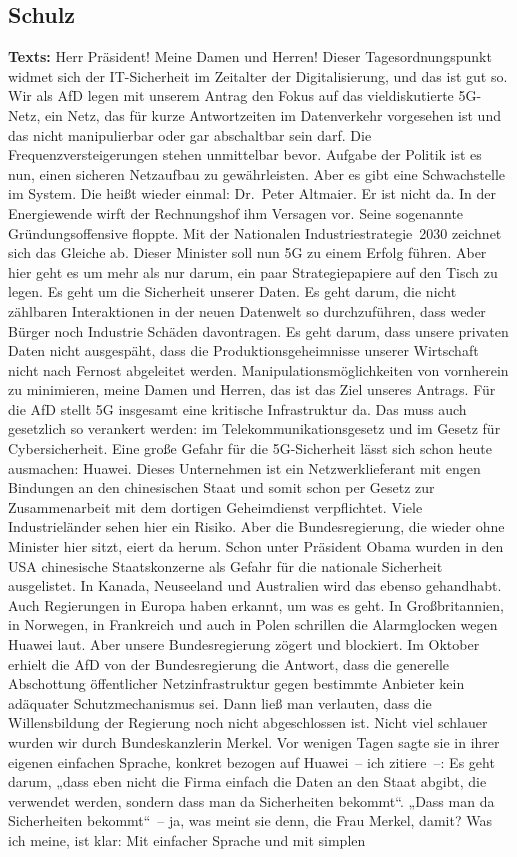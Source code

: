 \documentclass{article}
\begin{document}
\subsection{Schulz}
\noindent\textbf{Texts:} Herr Präsident! Meine Damen und Herren! Dieser Tagesordnungspunkt widmet sich der IT-Sicherheit im Zeitalter der Digitalisierung, und das ist gut so. Wir als AfD legen mit unserem Antrag den Fokus auf das vieldiskutierte 5G-Netz, ein Netz, das für kurze Antwortzeiten im Datenverkehr vorgesehen ist und das nicht manipulierbar oder gar abschaltbar sein darf. Die Frequenzversteigerungen stehen unmittelbar bevor. Aufgabe der Politik ist es nun, einen sicheren Netzaufbau zu gewährleisten. Aber es gibt eine Schwachstelle im System. Die heißt wieder einmal: Dr. Peter Altmaier. Er ist nicht da. In der Energiewende wirft der Rechnungshof ihm Versagen vor. Seine sogenannte Gründungsoffensive floppte. Mit der Nationalen Industriestrategie 2030 zeichnet sich das Gleiche ab.  Dieser Minister soll nun 5G zu einem Erfolg führen. Aber hier geht es um mehr als nur darum, ein paar Strategiepapiere auf den Tisch zu legen. Es geht um die Sicherheit unserer Daten. Es geht darum, die nicht zählbaren Interaktionen in der neuen Datenwelt so durchzuführen, dass weder Bürger noch Industrie Schäden davontragen. Es geht darum, dass unsere privaten Daten nicht ausgespäht, dass die Produktionsgeheimnisse unserer Wirtschaft nicht nach Fernost abgeleitet werden. Manipulationsmöglichkeiten von vornherein zu minimieren, meine Damen und Herren, das ist das Ziel unseres Antrags. Für die AfD stellt 5G insgesamt eine kritische Infrastruktur da. Das muss auch gesetzlich so verankert werden: im Telekommunikationsgesetz und im Gesetz für Cybersicherheit.  Eine große Gefahr für die 5G-Sicherheit lässt sich schon heute ausmachen: Huawei. Dieses Unternehmen ist ein Netzwerklieferant mit engen Bindungen an den chinesischen Staat und somit schon per Gesetz zur Zusammenarbeit mit dem dortigen Geheimdienst verpflichtet. Viele Industrieländer sehen hier ein Risiko. Aber die Bundesregierung, die wieder ohne Minister hier sitzt, eiert da herum. Schon unter Präsident Obama wurden in den USA chinesische Staatskonzerne als Gefahr für die nationale Sicherheit ausgelistet. In Kanada, Neuseeland und Australien wird das ebenso gehandhabt. Auch Regierungen in Europa haben erkannt, um was es geht. In Großbritannien, in Norwegen, in Frankreich und auch in Polen schrillen die Alarmglocken wegen Huawei laut. Aber unsere Bundesregierung zögert und blockiert. Im Oktober erhielt die AfD von der Bundesregierung die Antwort, dass die generelle Abschottung öffentlicher Netzinfrastruktur gegen bestimmte Anbieter kein adäquater Schutzmechanismus sei. Dann ließ man verlauten, dass die Willensbildung der Regierung noch nicht abgeschlossen ist. Nicht viel schlauer wurden wir durch Bundeskanzlerin Merkel. Vor wenigen Tagen sagte sie in ihrer eigenen einfachen Sprache, konkret bezogen auf Huawei – ich zitiere –: Es geht darum, „dass eben nicht die Firma einfach die Daten an den Staat abgibt, die verwendet werden, sondern dass man da Sicherheiten bekommt“. „Dass man da Sicherheiten bekommt“ – ja, was meint sie denn, die Frau Merkel, damit? Was ich meine, ist klar: Mit einfacher Sprache und mit simplen 
\end{document}
